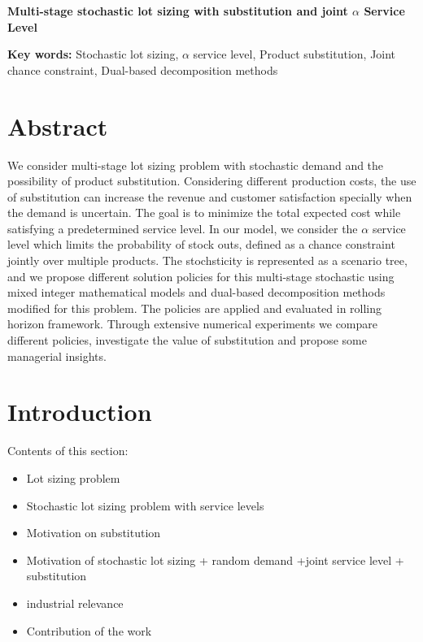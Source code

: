 \documentclass[10pt]{article}
\def\Title#1{\begin{center} {\Large {\bf #1} } \end{center}}
\begin{document}
\Title{Multi-stage stochastic lot sizing with substitution and joint $\alpha$ Service Level }

\bigskip\bigskip









 \textbf{\large Key words:} Stochastic lot sizing, $\alpha$ service level, Product substitution, Joint chance constraint, Dual-based decomposition methods



\section{Abstract}

We consider multi-stage lot sizing problem with stochastic demand and the possibility of product substitution. Considering different production costs, the use of substitution can increase the revenue and customer satisfaction specially when the demand is uncertain. The goal is to minimize the total expected cost while satisfying a predetermined service level. In our model, we consider the $\alpha$ service level which limits the probability of stock outs, defined as a chance constraint jointly over multiple products. The stochsticity is represented as a scenario tree, and we propose different solution policies for this multi-stage stochastic using mixed integer mathematical models and dual-based decomposition methods modified for this problem. The policies are applied and evaluated in rolling horizon framework. Through extensive numerical experiments we compare different policies, investigate the value of substitution and propose some managerial insights. 

\section{Introduction}
Contents of this section:
\begin{itemize}
    \item Lot sizing problem 
    \item Stochastic lot sizing problem with service levels
    \item Motivation on substitution
    \item Motivation of stochastic lot sizing + random demand +joint service level + substitution 
    \item industrial relevance
    \item Contribution of the work
\end{itemize}
\end{document}
